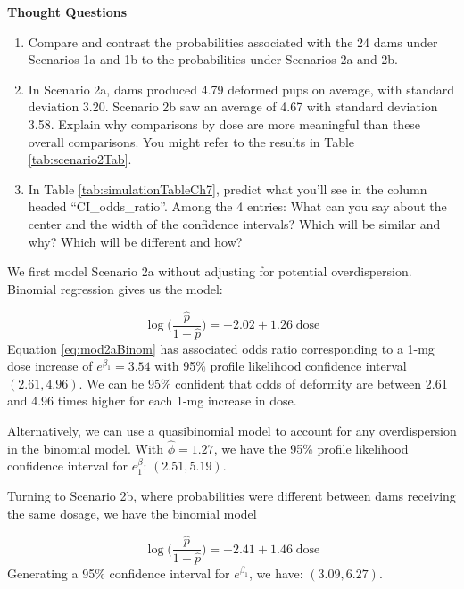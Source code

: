 \documentclass[
]{krantz}
\begin{document}
\vspace{1cm}

\textbf{Thought Questions}

\begin{enumerate}
\def\labelenumi{\arabic{enumi}.}
\setcounter{enumi}{5}
\item
  Compare and contrast the probabilities associated with the 24 dams under Scenarios 1a and 1b to the probabilities under Scenarios 2a and 2b.
\item
  In Scenario 2a, dams produced 4.79 deformed pups on average, with standard deviation 3.20. Scenario 2b saw an average of 4.67 with standard deviation 3.58. Explain why comparisons by dose are more meaningful than these overall comparisons. You might refer to the results in Table \ref{tab:scenario2Tab}.
\item
  In Table \ref{tab:simulationTableCh7}, predict what you'll see in the column headed ``CI\_odds\_ratio''. Among the 4 entries: What can you say about the center and the width of the confidence intervals? Which will be similar and why? Which will be different and how?
\end{enumerate}

We first model Scenario 2a without adjusting for potential overdispersion. Binomial regression gives us the model:

\begin{equation}
  \log\bigg( \frac{\hat{p}}{1-\hat{p}} \bigg) = -2.02 + 1.26\;\textrm{dose}
  \label{eq:mod2aBinom}
\end{equation}
Equation \eqref{eq:mod2aBinom} has associated odds ratio corresponding to a 1-mg dose increase of \(e^{\beta_1} = 3.54\) with 95\% profile likelihood confidence interval \((2.61, 4.96)\). We can be 95\% confident that odds of deformity are between 2.61 and 4.96 times higher for each 1-mg increase in dose.

Alternatively, we can use a quasibinomial model to account for any overdispersion in the binomial model. With \(\widehat{\phi} = 1.27\), we have the 95\% profile likelihood confidence interval for \(e^\beta_1\): \((2.51, 5.19)\).

Turning to Scenario 2b, where probabilities were different between dams receiving the same dosage, we have the binomial model

\begin{equation*}
  \log\bigg( \frac{\hat{p}}{1-\hat{p}} \bigg) = -2.41 + 1.46\;\textrm{dose}
\end{equation*}
Generating a 95\% confidence interval for \(e^{\beta_1}\), we have: \((3.09, 6.27)\).
\end{document}
